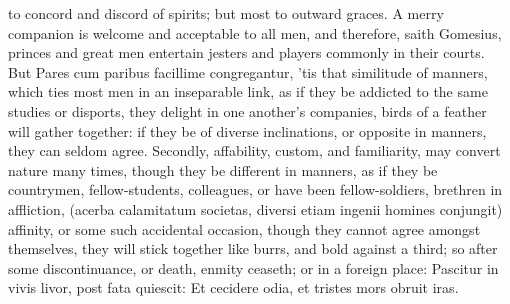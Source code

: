 {to concord and discord of spirits; but most to outward graces. A merry
companion is welcome and acceptable to all men, and therefore, saith
Gomesius, princes and great men entertain jesters and players
commonly in their courts. But Pares cum paribus facillime
congregantur, 'tis that similitude of manners, which ties most
men in an inseparable link, as if they be addicted to the same studies
or disports, they delight in one another's companies, birds of a
feather will gather together: if they be of diverse inclinations, or
opposite in manners, they can seldom agree. Secondly, affability,
custom, and familiarity, may convert nature many times, though they be
different in manners, as if they be countrymen, fellow-students,
colleagues, or have been fellow-soldiers, brethren in affliction,
(acerba calamitatum societas, diversi etiam ingenii homines
conjungit) affinity, or some such accidental occasion, though they
cannot agree amongst themselves, they will stick together like burrs,
and bold against a third; so after some discontinuance, or death,
enmity ceaseth; or in a foreign place:
Pascitur in vivis livor, post fata quiescit:
Et cecidere odia, et tristes mors obruit iras.

}
